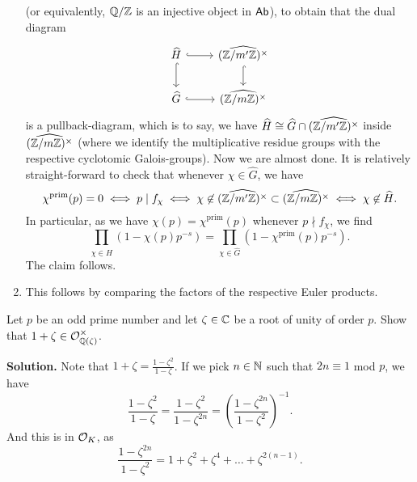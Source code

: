 \documentclass[a4paper,11pt]{article}
\begin{document}
\begin{enumerate}[wide, labelindent=0pt]
        (or equivalently, $\mathbb{Q}/\mathbb{Z}$ is an injective object in $\textnormal{$\textsf{Ab}$}$), to obtain 
        that the dual diagram
        \begin{equation*}
            \begin{tikzcd}[ampersand replacement=\&]
            	{\hat H} \& {\hat {(\Z/m'\Z)^\times}} \\
            	{\hat G} \& {\hat {(\Z/m\Z)^\times}}
            	\arrow[hook, from=1-1, to=2-1]
            	\arrow[hook, from=1-1, to=1-2]
            	\arrow[hook, from=2-1, to=2-2]
            	\arrow[hook, from=1-2, to=2-2]
            \end{tikzcd}
        \end{equation*}
        is a pullback-diagram, which is to say, we have $\widehat H \cong 
        \widehat G \cap \widehat {(\mathbb{Z}/m'\mathbb{Z})^\times}$ inside ${\widehat {(\mathbb{Z}/m\mathbb{Z})^\times}}$ (where 
        we identify the multiplicative residue groups with the respective 
        cyclotomic Galois-groups). Now we are almost done. It is relatively straight-forward
        to check that whenever $\chi \in \hat G$, we have
        \begin{equation*}
            \chi^{\mathrm{prim}}(p) = 0 \iff p \mid f_\chi \iff \chi \not \in {\widehat{(\mathbb{Z}/m'\mathbb{Z})^\times}} \subset {\widehat{(\mathbb{Z}/m\mathbb{Z})^\times}} \iff \chi \not \in \widehat H.
        \end{equation*}
        In particular, as we have $\chi(p) = \chi^{\mathrm{prim}}(p)$ whenever
        $p \nmid f_\chi$, we find 
        \begin{equation*}
            \prod_{\chi \in \hat H}(1- \chi(p)p^{-s}) = \prod_{\chi \in \hat G}
            (1 - \chi^{\mathrm{prim}}(p)p^{-s}).
        \end{equation*}
        The claim follows.
        
    \item This follows by comparing the factors of the respective Euler products.
\end{enumerate}

Let $p$ be an odd prime number and let $\zeta \in \mathbb{C}$ be a root of unity of order $p$. 
Show that $1+ \zeta \in \mathcal{O}_{\mathbb{Q}(\zeta)}^\times$. 

\textbf{Solution.}
Note that $1+\zeta = \frac{1-\zeta^2}{1-\zeta}$. If we pick $n \in \mathbb{N}$ such that 
$2n \equiv 1$ mod $p$, we have
\begin{equation*}
    \frac{1-\zeta^2}{1-\zeta} = \frac{1-\zeta^2}{1-\zeta^{2n}} = \left(
    \frac{1-\zeta^{2n}}{1-\zeta^{2}} \right)^{-1}.
\end{equation*}
And this is in $\mathcal{O}_K$, as 
\begin{equation*}
    \frac{1-\zeta^{2n}}{1-\zeta^2} = 1 + \zeta^2 + \zeta^4 + \dots + \zeta^{2(n-1)}.
\end{equation*}

\contactend
\end{document}
